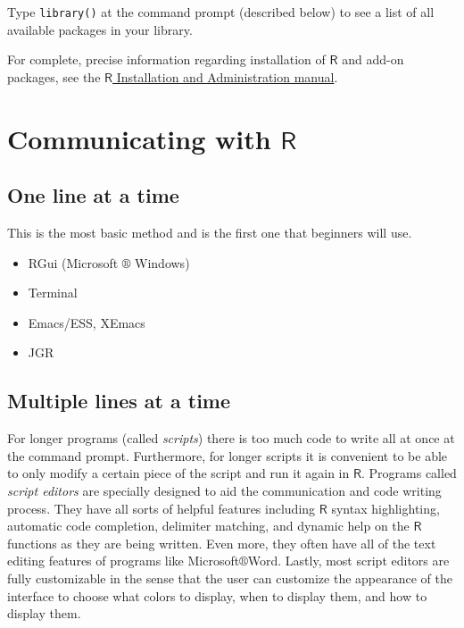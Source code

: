\documentclass[captions=tableheading]{scrbook}
\begin{document}
Type \texttt{library()} at the command prompt (described below) to see a list of all available
packages in your library.

For complete, precise information regarding installation of \(\mathsf{R}\) and add-on packages, see the \href{http://cran.r-project.org/manuals.html}{\(\mathsf{R}\) Installation and Administration manual}.
\section{Communicating with \(\mathsf{R}\)}
\label{sec-2-2}
\label{sec-Communicating-with-R}
\subsection{One line at a time}
\label{sec-2-2-1}


This is the most basic method and is the first one that beginners will use.
\begin{itemize}
\item RGui (Microsoft \(\circledR\) Windows)
\item Terminal
\item Emacs/ESS, XEmacs
\item JGR
\end{itemize}
\subsection{Multiple lines at a time}
\label{sec-2-2-2}


For longer programs (called \emph{scripts}) there is too much code to write all at once at the command prompt. Furthermore, for longer scripts it is convenient to be able to only modify a certain piece of the script and run it again in \(\mathsf{R}\). Programs called \emph{script editors} are specially designed to aid the communication and code writing process. They have all sorts of helpful features including \(\mathsf{R}\) syntax highlighting, automatic code completion, delimiter matching, and dynamic help on the \(\mathsf{R}\) functions as they are being written. Even more, they often have all of the text editing features of programs like Microsoft\(\circledR\)Word. Lastly, most script editors are fully customizable in the sense that the user can customize the appearance of the interface to choose what colors to display, when to display them, and how to display them.
\end{document}
